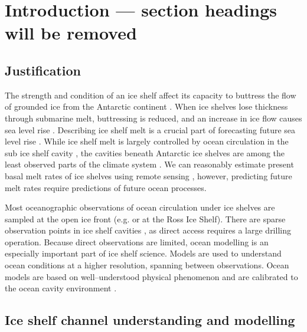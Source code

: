 
\section{Introduction --- section headings will be removed}

\subsection{Justification}

The strength and condition of an ice shelf affect its capacity to buttress the flow of grounded ice from the Antarctic continent \citep{gagliardini2010coupling}. When ice shelves lose thickness through submarine melt, buttressing is reduced, and an increase in ice flow causes sea level rise \citep{pritchard2012antarctic}.
Describing ice shelf melt is a crucial part of forecasting future sea level rise \citep{liu2015ocean,scambos2017much}.  While ice shelf melt is largely controlled by ocean circulation in the sub ice shelf cavity \citep{rignot2013ice}, the cavities beneath Antarctic ice shelves are among the least observed parts of the climate system \citep{stevens2020ocean}. We can reasonably estimate present basal melt rates of ice shelves using remote sensing \citep[e.g][]{rignot2013ice,mankoff2012role,goldberg2019accurately}, however, predicting future melt rates require predictions of future ocean processes. 

Most oceanographic observations of ocean circulation under ice shelves are sampled at the open ice front 
(e.g. \cite{arzeno2014ocean} or \cite{smethie2005circulation} at the Ross Ice Shelf). There are sparse observation points in ice shelf cavities \citep[e.g.][]{begeman2018ocean,stevens2020ocean,foster1983temperature}, as direct access requires a large drilling operation. 
Because direct observations are limited, ocean modelling is an especially important part of ice shelf science. Models are used to understand ocean conditions at a higher resolution, spanning between observations.  Ocean models are based on well--understood physical phenomenon  and are calibrated to the ocean cavity environment \citep[e.g.][]{millgate2013effect, holland2003modelling}. 


\subsection{Ice shelf channel understanding and modelling}

